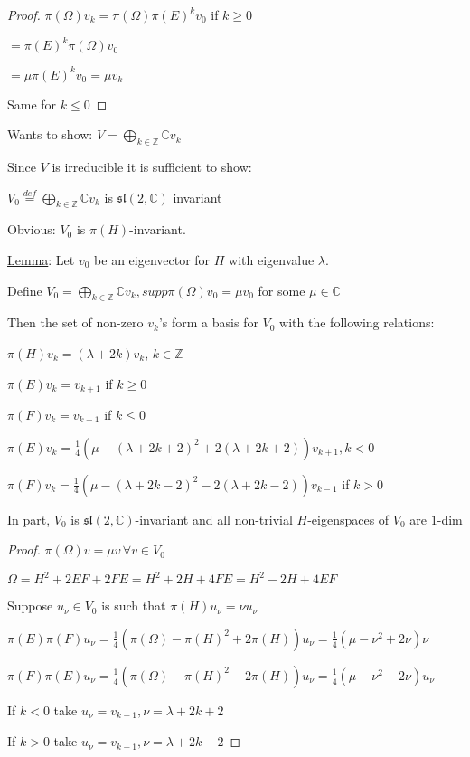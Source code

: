 \documentclass{article}
\theoremstyle{definition}
\begin{document}
\begin{proof}
    \(\pi(\Omega)v_k = \pi(\Omega)\pi(E)^k v_0\) if \(k \geq 0\)
    
    \(= \pi(E)^k \pi(\Omega)v_0\)
    
    \(= \mu \pi(E)^k v_0 = \mu v_k\) 

    Same for \(k \leq 0\) 
\end{proof}

Wants to show: \(V = \bigoplus_{k\in\mathbb{Z}}\mathbb{C} v_k\) 

Since \(V\) is irreducible it is sufficient to show:

\(V_0 \overset{def}{=} \bigoplus_{k\in\mathbb{Z}} \mathbb{C} v_k\) is \(\mathfrak{sl}(2,\mathbb{C})\) invariant

Obvious: \(V_0\) is \(\pi(H)\)-invariant.

\underline{Lemma}: Let \(v_0\) be an eigenvector for \(H\) with eigenvalue \(\lambda\).

Define \(V_0 = \bigoplus_{k\in\mathbb{Z}}\mathbb{C} v_k, supp \pi(\Omega)v_0 = \mu v_0\) for some \(\mu \in \mathbb{C} \)

Then the set of non-zero \(v_k\)'s form a basis for \(V_0\) with the following relations:

\(\pi(H)v_k = (\lambda + 2k)v_k\), \(k\in\mathbb{Z}\) 

\(\pi(E)v_k = v_{k+1}\) if \(k \geq 0\)

\(\pi(F)v_k = v_{k-1}\) if \(k \leq 0\)  

\(\pi(E)v_k = \frac{1}{4} \left( \mu - (\lambda + 2k + 2)^2 + 2(\lambda + 2k + 2) \right) v_{k+1}, k < 0 \) 

\(\pi(F)v_k = \frac{1}{4} \left( \mu - (\lambda + 2k - 2)^2 - 2(\lambda + 2k - 2) \right) v_{k-1} \) if \(k>0\) 

In part, \(V_0\) is \(\mathfrak{sl}(2,\mathbb{C})\)-invariant and all non-trivial \(H\)-eigenspaces of \(V_0\) are \(1\)-dim

\begin{proof}
    \(\pi(\Omega)v = \mu v \, \forall v\in V_0\) 

    \(\Omega = H^2 + 2EF + 2FE = H^2 + 2H + 4FE = H^2 - 2H + 4EF\) 

    Suppose \(u_\nu \in V_0\) is such that \(\pi(H) u_\nu = \nu u_\nu\)
    
    \(\pi (E) \pi (F) u_\nu = \frac{1}{4} (\pi(\Omega) - \pi(H)^2 + 2\pi(H))u_\nu = \frac{1}{4}(\mu - \nu ^2 + 2\nu)\nu\)
    
    \(\pi(F)\pi(E)u_\nu = \frac{1}{4}(\pi(\Omega)-\pi(H)^2 - 2\pi(H))u_\nu = \frac{1}{4}(\mu - \nu^2 - 2\nu )u_\nu\)
    
    If \(k < 0\) take \(u_\nu = v_{k+1}, \nu = \lambda + 2k + 2\)
    
    If \(k > 0\) take \(u_\nu = v_{k-1}, \nu = \lambda + 2k - 2\)

\end{proof}
\end{document}
